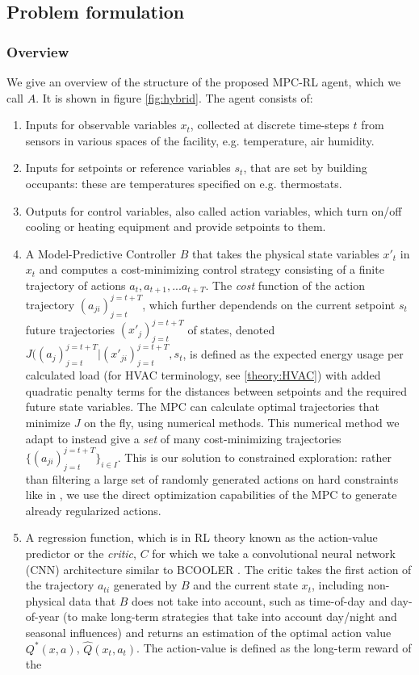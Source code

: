\documentclass{article}
\theoremstyle{definition}
\theoremstyle{remark}
\begin{document}
\subsection{Problem formulation}
\subsubsection{Overview}
We give an overview of the structure of the proposed MPC-RL agent, which we call $A$. It is shown in figure \ref{fig:hybrid}. The agent consists of:
\begin{enumerate}
    \item Inputs for observable variables $x_t$, collected at discrete time-steps $t$ from sensors in various spaces of the facility, e.g. temperature, air humidity. 
    \item Inputs for setpoints or reference variables $s_t$, that are set by building occupants: these are temperatures specified on e.g. thermostats.
    \item Outputs for control variables, also called action variables, which turn on/off cooling or heating equipment and provide setpoints to them.
    \item A Model-Predictive Controller $B$ that takes the physical state variables $x'_t$ in $x_t$ and computes a cost-minimizing control strategy consisting of a finite trajectory of actions $a_t, a_{t+1}, ... a_{t+T}$. The \textit{cost} function of the action trajectory $(a_{ji})_{j=t}^{j=t+T}$, which further dependends on the current setpoint $s_t$ future trajectories $(x'_j)_{j=t}^{j=t+T}$ of states, denoted $J((a_{j})_{j=t}^{j=t+T}| (x'_{ji})_{j=t}^{j=t+T},s_t$, is defined as the expected energy usage per calculated load (for HVAC terminology, see \ref{theory:HVAC}) with added quadratic penalty terms for the distances between setpoints and the required future state variables. The MPC can calculate optimal trajectories that minimize $J$ on the fly, using numerical methods. This numerical method we adapt to instead give a \textit{set} of many cost-minimizing trajectories $\{(a_{ji})_{j=t}^{j=t+T}\}_{i\in I}$.  This is our solution to constrained exploration: rather than filtering a large set of randomly generated actions on hard constraints like in \cite{luo2022controlling}, we use the direct optimization capabilities of the MPC to generate already regularized actions. 
    \item A regression function, which is in RL theory known as the action-value predictor or the \textit{critic}, $C$ for which we take a convolutional neural network (CNN) architecture similar to BCOOLER \cite{luo2022controlling}. The critic takes the first action of the trajectory $a_{ti}$ generated by $B$ and the current state $x_t$, including non-physical data that $B$ does not take into account, such as time-of-day and day-of-year (to make long-term strategies that take into account day/night and seasonal influences) and returns an estimation of the optimal action value $Q^*(x,a)$, $\hat Q(x_t, a_t)$. The action-value is defined as the long-term reward of the 

\end{enumerate}
\end{document}
